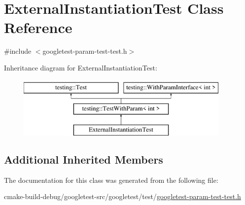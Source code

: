 \hypertarget{classExternalInstantiationTest}{}\section{External\+Instantiation\+Test Class Reference}
\label{classExternalInstantiationTest}


{\ttfamily \#include $<$googletest-\/param-\/test-\/test.\+h$>$}

Inheritance diagram for External\+Instantiation\+Test\+:\begin{figure}[H]
\begin{center}
\leavevmode
\includegraphics[height=3.000000cm]{classExternalInstantiationTest}
\end{center}
\end{figure}
\subsection*{Additional Inherited Members}


The documentation for this class was generated from the following file\+:\begin{DoxyCompactItemize}
\item 
cmake-\/build-\/debug/googletest-\/src/googletest/test/\mbox{\hyperlink{googletest-param-test-test_8h}{googletest-\/param-\/test-\/test.\+h}}\end{DoxyCompactItemize}
